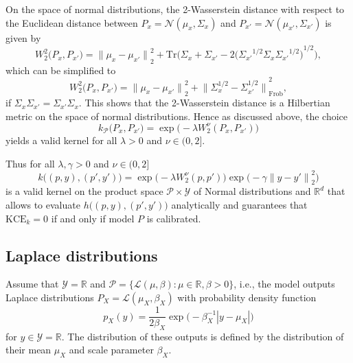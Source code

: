 \documentclass{article}
\begin{document}
On the space of normal distributions, the 2-Wasserstein distance with
respect to the Euclidean distance between
$P_x = \mathcal{N}(\mu_x, \Sigma_x)$ and
$P_{x'} = \mathcal{N}(\mu_{x'}, \Sigma_{x'})$ is given by
\begin{equation*}
    W^2_2\big(P_x, P_{x'}\big)
    = {\|\mu_x - \mu_{x'}\|}_2^2 + \mathrm{Tr}\bigg(\Sigma_x + \Sigma_{x'} - 2{\Big({\Sigma_{x'}}^{1/2} \Sigma_x {\Sigma_{x'}}^{1/2}\Big)}^{1/2}\bigg),
\end{equation*}
which can be simplified to
\begin{equation*}
    W^2_2\big(P_x, P_{x'}\big)
    = {\big\|\mu_x - \mu_{x'}\big\|}_2^2 + {\Big\|\Sigma_{x}^{1/2} - \Sigma_{x'}^{1/2}\Big\|}_{\mathrm{Frob}}^2,
\end{equation*}
if $\Sigma_x \Sigma_{x'} = \Sigma_{x'} \Sigma_x$. This shows that the
2-Wasserstein distance is a Hilbertian metric on the space of normal
distributions. Hence as discussed above, the choice
\begin{equation*}
    k_{\mathcal{P}}\big(P_x, P_{x'}\big) = \exp{\big( - \lambda W_2^\nu(P_x, P_{x'})\big)}
\end{equation*}
yields a valid kernel for all $\lambda > 0$ and $\nu \in (0, 2]$.

Thus for all $\lambda, \gamma > 0$ and $\nu \in (0, 2]$
\begin{equation*}
    k\big((p, y), (p', y')\big) = \exp{\big(-\lambda W^\nu_2(p, p')\big)} \exp{\Big(-\gamma {\|y-y'\|}^2_2\Big)}
\end{equation*}
is a valid kernel on the product space $\mathcal{P} \times \mathcal{Y}$
of Normal distributions and $\mathbb{R}^d$ that allows to evaluate
$h\big((p, y), (p', y')\big)$ analytically and guarantees that $\mathrm{KCE}_k = 0$
if and only if model $P$ is calibrated.

\subsection{Laplace distributions}
\label{app:laplace}

Assume that $\mathcal{Y} = \mathbb{R}$ and
$\mathcal{P} = \{\mathcal{L}(\mu, \beta) \colon \mu \in \mathbb{R}, \beta > 0\}$,
i.e., the model outputs Laplace distributions $P_X = \mathcal{L}(\mu_X, \beta_X)$ with
probability density function
\begin{equation*}
    p_X(y) = \frac{1}{2 \beta_X} \exp{\big(- \beta_X^{-1} |y - \mu_X| \big)}
\end{equation*}
for $y \in \mathcal{Y} = \mathbb{R}$. The distribution of these outputs is
defined by the distribution of their mean $\mu_X$ and scale parameter $\beta_X$.
\end{document}
